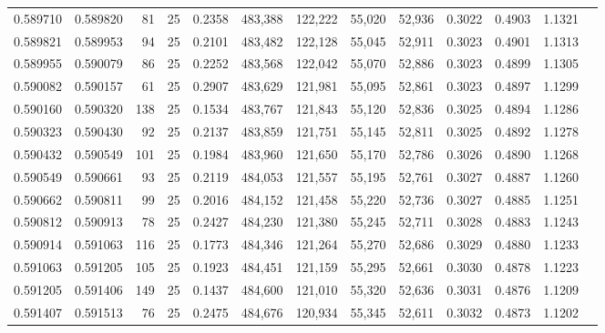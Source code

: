\begin{tabular}{rrrrrrrrrrrrr}
0.589710 & 0.589820 &    81 &  25 &                                     0.2358 & 483,388 & 122,222 &  55,020 &  52,936 & 0.3022 & 0.4903 & 1.1321 \\
0.589821 & 0.589953 &    94 &  25 &                                     0.2101 & 483,482 & 122,128 &  55,045 &  52,911 & 0.3023 & 0.4901 & 1.1313 \\
0.589955 & 0.590079 &    86 &  25 &                                     0.2252 & 483,568 & 122,042 &  55,070 &  52,886 & 0.3023 & 0.4899 & 1.1305 \\
0.590082 & 0.590157 &    61 &  25 &                                     0.2907 & 483,629 & 121,981 &  55,095 &  52,861 & 0.3023 & 0.4897 & 1.1299 \\
0.590160 & 0.590320 &   138 &  25 &                                     0.1534 & 483,767 & 121,843 &  55,120 &  52,836 & 0.3025 & 0.4894 & 1.1286 \\
0.590323 & 0.590430 &    92 &  25 &                                     0.2137 & 483,859 & 121,751 &  55,145 &  52,811 & 0.3025 & 0.4892 & 1.1278 \\
0.590432 & 0.590549 &   101 &  25 &                                     0.1984 & 483,960 & 121,650 &  55,170 &  52,786 & 0.3026 & 0.4890 & 1.1268 \\
0.590549 & 0.590661 &    93 &  25 &                                     0.2119 & 484,053 & 121,557 &  55,195 &  52,761 & 0.3027 & 0.4887 & 1.1260 \\
0.590662 & 0.590811 &    99 &  25 &                                     0.2016 & 484,152 & 121,458 &  55,220 &  52,736 & 0.3027 & 0.4885 & 1.1251 \\
0.590812 & 0.590913 &    78 &  25 &                                     0.2427 & 484,230 & 121,380 &  55,245 &  52,711 & 0.3028 & 0.4883 & 1.1243 \\
0.590914 & 0.591063 &   116 &  25 &                                     0.1773 & 484,346 & 121,264 &  55,270 &  52,686 & 0.3029 & 0.4880 & 1.1233 \\
0.591063 & 0.591205 &   105 &  25 &                                     0.1923 & 484,451 & 121,159 &  55,295 &  52,661 & 0.3030 & 0.4878 & 1.1223 \\
0.591205 & 0.591406 &   149 &  25 &                                     0.1437 & 484,600 & 121,010 &  55,320 &  52,636 & 0.3031 & 0.4876 & 1.1209 \\
0.591407 & 0.591513 &    76 &  25 &                                     0.2475 & 484,676 & 120,934 &  55,345 &  52,611 & 0.3032 & 0.4873 & 1.1202 \\

\end{tabular}

